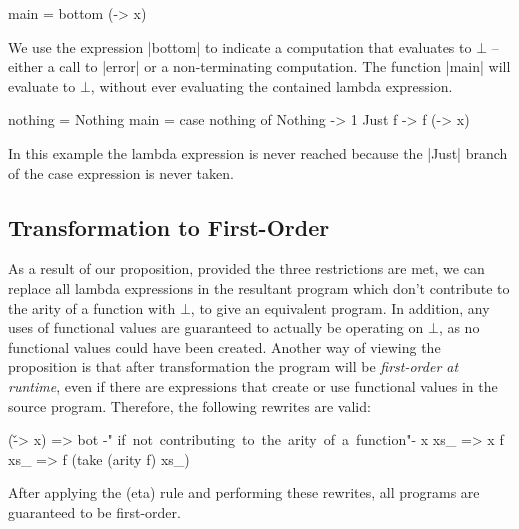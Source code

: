 \documentclass[preprint]{sigplanconf}
\begin{document}
\begin{example}
\begin{code}
main = bottom (\x -> x)
\end{code}

We use the expression |bottom| to indicate a computation that evaluates to $\bot{}$ -- either a call to |error| or a non-terminating computation. The function |main| will evaluate to $\bot{}$, without ever evaluating the contained lambda expression.
\end{example}

\begin{example}
\begin{onepage}
\begin{code}
nothing = Nothing
main = case  nothing of
             Nothing  -> 1
             Just f   -> f (\x -> x)
\end{code}
\end{onepage}

In this example the lambda expression is never reached because the |Just| branch of the case expression is never taken.
\end{example}

\subsection{Transformation to First-Order}
\label{sec:consequences}

As a result of our proposition, provided the three restrictions are met, we can replace all lambda expressions in the resultant program which don't contribute to the arity of a function with $\bot{}$, to give an equivalent program. In addition, any uses of functional values are guaranteed to actually be operating on $\bot{}$, as no functional values could have been created. Another way of viewing the proposition is that after transformation the program will be \textit{first-order at runtime}, even if there are expressions that create or use functional values in the source program. Therefore, the following rewrites are valid:

\ignore\begin{code}
(\v -> x)  => bot    {-"\hspace{3mm} \hbox{if not contributing to the arity of a function}"-}
x xs_      => x
f xs_      => f (take (arity f) xs_)
\end{code}

After applying the (eta) rule and performing these rewrites, all programs are guaranteed to be first-order.
\end{document}
